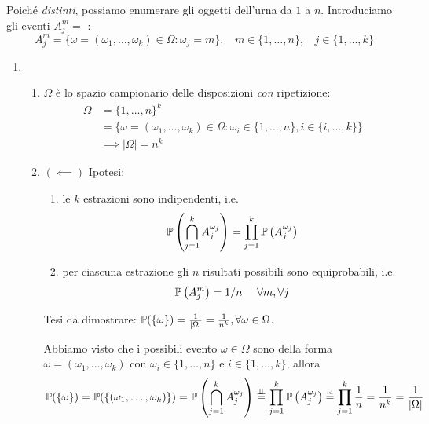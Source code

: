 Poiché \textit{distinti}, possiamo enumerare gli oggetti dell'urna da $1$ a $n$. Introduciamo gli eventi $A_{j}^{m} =$ :
\begin{equation*}
	A_{j}^{m} =\{\omega =(\omega_{1} ,\dots ,\omega_{k}) \in \Omega :\omega_{j} =m\} ,\ \ \ \ m\in \{1,\dots,n\} ,\ \ \ \ j\in \{1,\dots,k\}
\end{equation*}
\begin{enumerate}
	\item 
	\begin{enumerate}
		\item $\Omega $ è lo spazio campionario delle disposizioni \textit{con} ripetizione:
		\begin{align*}
			\Omega  & =\{1,\dots,n\}^{k}\\
			 & =\{\omega =(\omega_{1} ,\dots ,\omega_{k}) \in \Omega :\omega_{i} \in \{1,\dots,n\} ,i\in \{i,\dots,k\}\}\\
			 & \implies | \Omega | =n^{k}
		\end{align*}
		\item $(\impliedby)$ Ipotesi:
		\begin{enumerate}
			\item le $k$ estrazioni sono indipendenti, i.e.
			\begin{equation*}
				\mathbb{P}\left(\bigcap_{j=1}^{k} A_{j}^{\omega_{j}}\right) =\prod_{j=1}^{k}\mathbb{P}\left(A_{j}^{\omega_{j}}\right)
			\end{equation*}
			\item per ciascuna estrazione gli $n$ risultati possibili sono equiprobabili, i.e.
			\begin{equation*}
				\mathbb{P}\left(A_{j}^{m}\right) =1/n\ \ \ \ \forall m,\forall j
			\end{equation*}
		\end{enumerate}
		Tesi da dimostrare: $\mathbb{P}(\{\omega \}) =\frac{1}{| \Omega | } =\frac{1}{n^{k}} ,\forall \omega \in \Omega $.

		Abbiamo visto che i possibili evento $\omega \in \Omega $ sono della forma $\omega =(\omega_{1} ,\dots ,\omega_{k})$ con $\omega_{i} \in \{1,\dots,n\}$ e $i\in \{1,\dots,k\}$, allora
		\begin{align*}
			\mathbb{P}(\{\omega \}) & =\mathbb{P}(\{(\omega_{1} ,\dots ,\omega_{k})\}) = \mathbb{P}\left(\bigcap_{j=1}^{k} A_{j}^{\omega_{j}}\right) \overset{\perp \!\!\! \perp}{=} \prod_{j=1}^{k}\mathbb{P}\left(A_{j}^{\omega_{j}}\right) \overset{\text{\tiny id}}{=} \prod_{j=1}^{k}\frac{1}{n} =\frac{1}{n^{k}} =\frac{1}{| \Omega | }
		\end{align*}


\end{enumerate}
\end{enumerate}
